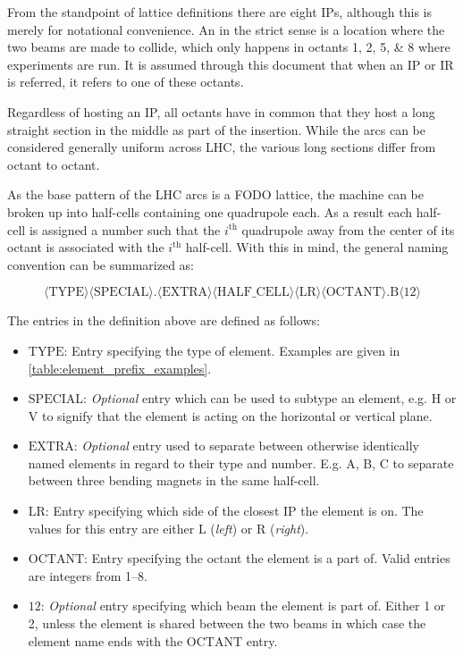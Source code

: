 From the standpoint of lattice definitions there are eight IPs, although this is merely for notational convenience. 
An  in the strict sense is a location where the two beams are made to collide, which only happens in octants \numlist{1;2;5;8} where experiments are run.
It is assumed through this document that when an IP or IR is referred, it refers to one of these octants.

Regardless of hosting an IP, all octants have in common that they host a long straight section in the middle as part of the insertion.
While the arcs can be considered generally uniform across LHC, the various long sections differ from octant to octant.

As the base pattern of the LHC arcs is a FODO lattice, the machine can be broken up into half-cells containing one quadrupole each.
As a result each half-cell is assigned a number such that the \(i^{\mathrm{th}}\) quadrupole away from the center of its octant is associated with the \(i^{\mathrm{th}}\) half-cell.
With this in mind, the general naming convention can be summarized as:

\begin{equation*}
        \langle \mathrm{TYPE} \rangle \langle \mathrm{SPECIAL} \rangle . \langle \mathrm{EXTRA} \rangle \langle \mathrm{HALF\_CELL} \rangle \langle \mathrm {LR} \rangle \langle \mathrm{OCTANT} \rangle . \mathrm{B} \langle \mathrm{12} \rangle
    \label{equation:lhc_naming_nomenclature}
\end{equation*}

The entries in the definition above are defined as follows:
\begin{itemize}
    \item \(\mathrm{TYPE}\): Entry specifying the type of element. Examples are given in \cref{table:element_prefix_examples}.
    \item \(\mathrm{SPECIAL}\): \textit{Optional} entry which can be used to subtype an element, e.g. \(\mathrm{H}\) or \(\mathrm{V}\) to signify that the element is acting on the horizontal or vertical plane.
    \item \(\mathrm{EXTRA}\): \textit{Optional} entry used to separate between otherwise identically named elements in regard to their type and number. E.g. \(\mathrm{A}\), \(\mathrm{B}\), \(\mathrm{C}\) to separate between three bending magnets in the same half-cell.
    \item \(\mathrm{LR}\): Entry specifying which side of the closest IP the element is on. The values for this entry are either \(\mathrm{L}\) (\textit{left}) or \(\mathrm{R}\) (\textit{right}).
    \item \(\mathrm{OCTANT}\): Entry specifying the octant the element is a part of. Valid entries are integers from \numrange{1}{8}.
    \item \(\mathrm{12}\): \textit{Optional} entry specifying which beam the element is part of. Either \num{1} or \num{2}, unless the element is shared between the two beams in which case the element name ends with the \(\mathrm{OCTANT}\) entry.
\end{itemize}

